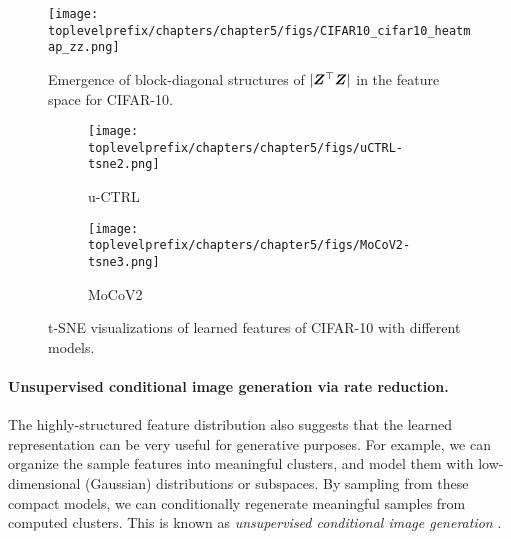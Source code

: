 \documentclass[\toplevelprefix/book-main.tex]{subfiles}
\begin{document}
\begin{figure}[t]
     \footnotesize
     \centering
    \texttt{[image: \\toplevelprefix/chapters/chapter5/figs/CIFAR10\_cifar10\_heatmap\_zz.png]}
    \caption{\small Emergence of block-diagonal structures of $|\bm{Z}^\top \bm{Z}|$ in the feature space for CIFAR-10.}
    \label{fig:heatmap_z}
\end{figure}

\begin{figure}[ht!]
    \begin{subfigure}[t]{0.46\textwidth}
        \centering
        \texttt{[image: \\toplevelprefix/chapters/chapter5/figs/uCTRL-tsne2.png]}
        \caption{u-CTRL}
    \end{subfigure}
    \hfill
    \begin{subfigure}[t]{0.46\textwidth}
        \centering
        \texttt{[image: \\toplevelprefix/chapters/chapter5/figs/MoCoV2-tsne3.png]}
        \caption{MoCoV2}
    \end{subfigure}
    \caption{\small t-SNE visualizations of learned features of CIFAR-10 with different models.} 
    \label{fig:tsne}
\end{figure}

\paragraph{Unsupervised conditional image generation via rate reduction.}
The highly-structured feature distribution also suggests that the learned representation can be very useful for generative purposes. For example, we can organize the sample features into meaningful clusters, and model them with low-dimensional (Gaussian) distributions or subspaces. By sampling from these compact models, we can conditionally regenerate meaningful samples from computed clusters. This is known as {\em unsupervised conditional image generation} \cite{hwang2021stein}. 
\end{document}
